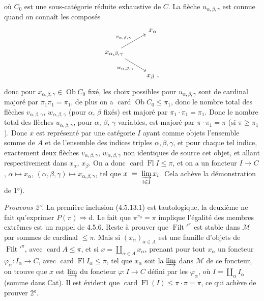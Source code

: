 \documentclass[11pt]{article}
\newcommand{\printedpage}[1]{\marginpar{\footnotesize p.~#1}}
\newcommand{\msp}[1]{\marginpar{\footnotesize [#1]}}
\newcommand{\Filt}{\operatorname{Filt}}
\newcommand{\card}{\operatorname{card}}
\newcommand{\Fl}{\operatorname{Fl}}
\newcommand{\Ob}{\operatorname{Ob}}
\begin{document}
\printedpage{41}
où $C_0$ est une sous-catégorie réduite exhaustive de $C$. La flèche $u_{\alpha,\beta,\gamma}$ est connue quand on connaît les composés
\msp{page 131}
\[
\begin{tikzcd}
& x_{\alpha} \\
x_{\alpha,\beta,\gamma} \arrow[ur, "v_{\alpha,\beta,\gamma}"] \arrow[dr, "w_{\alpha,\beta,\gamma}"'] & \\
& x_{\beta} \text{ ,}
\end{tikzcd}
\]
donc pour $x_{\alpha,\beta,\gamma} \in \Ob C_0$ fixé, les choix possibles pour $u_{\alpha,\beta,\gamma}$ sont de cardinal majoré par $\pi_1\pi_1 = \pi_1$, de plus on a $\card \Ob C_0 \leqslant \pi_1$, donc le nombre total des flèches $v_{\alpha,\beta,\gamma}$, $w_{\alpha,\beta,\gamma}$ (pour $\alpha$, $\beta$ fixés) est majoré par $\pi_1 \cdot \pi_1 = \pi_1$. Donc le nombre total des flèches $u_{\alpha,\beta,\gamma}$, pour $\alpha$, $\beta$, $\gamma$ variables, est majoré par $\pi \cdot \pi_1 = \pi$ (si $\pi \geqslant \pi_1$). Donc $x$ est représenté par une catégorie $I$ ayant comme objets l'ensemble somme de $A$ et de l'ensemble des indices triples $\alpha,\beta,\gamma$, et pour chaque tel indice, exactement deux flèches $v_{\alpha,\beta,\gamma}$, $w_{\alpha,\beta,\gamma}$ non identiques de source cet objet, et allant respectivement dans $x_{\alpha}$, $x_{\beta}$. On a donc $\card \Fl I \leqslant \pi$, et on a un foncteur $I \longrightarrow C$, $\alpha \longmapsto x_{\alpha}$, $(\alpha,\beta,\gamma) \longmapsto x_{\alpha,\beta,\gamma}$, tel que $x \ = \ \varinjlim\limits_{i\in I} x_i$. Cela achève la démonstration de 1°).

\msp{page 132}
\textit{Prouvons 2°.} La première inclusion (4.5.13.1) est tautologique, la deuxième ne fait qu'exprimer $P(\pi) \Longrightarrow \mathrm{d}$. Le fait que $\pi^{\pi_0} = \pi$ implique l'égalité des membres extrêmes est un rappel de 4.5.6. Reste à prouver que $\Filt'^{\pi}$ est stable dans $\mathcal{M}$ par sommes de cardinal $\leqslant \pi$. Mais si $(x_{\alpha})_{\alpha\in A}$ est une famille d'objets de $\Filt'^{\pi}$, avec $\card A \leqslant \pi$, et si $x = \coprod_{\alpha\in A} x_{\alpha}$, prenant pour tout $x_{\alpha}$ un foncteur $\varphi_{\alpha} : I_{\alpha} \longrightarrow C$, avec $\card \Fl I_{\alpha} \leqslant \pi$, tel que $x_{\alpha}$ soit la $\varinjlim$ dans $\mathcal{M}$ de ce foncteur, on trouve que $x$ est $\varinjlim$ du foncteur $\varphi : I \longrightarrow C$ défini par les $\varphi_{\alpha}$, où $I = \coprod_{\alpha} I_{\alpha}$ (somme dans Cat). Il est évident que $\card \Fl(I) \leqslant \pi\cdot\pi = \pi$, ce qui achève de prouver 2°.
\end{document}
